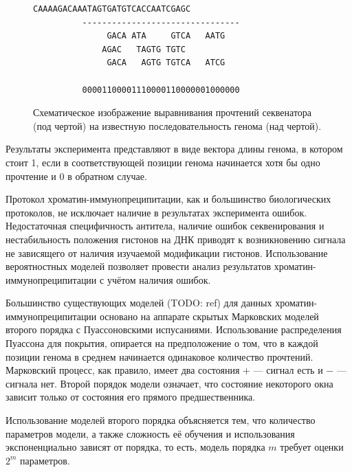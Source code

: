 \documentclass[10pt,a4paper]{article}
\begin{document}
\begin{figure}[h]
  \centering
\begin{Verbatim}[commandchars=\\\{\}]
          CAAAAGACAAATAGTGATGTCACCAATCGAGC
          --------------------------------
               GACA ATA     GTCA   AATG
              AGAC   TAGTG TGTC
               GACA   AGTG TGTCA   ATCG

          00001100001110000110000001000000
\end{Verbatim}
  \caption{Схематическое изображение выравнивания прочтений секвенатора (под чертой)
    на известную последовательность генома (над чертой).}
  \label{fig:chip-seq}
\end{figure}

Результаты эксперимента представляют в виде вектора длины генома, в котором
стоит 1, если в соответствующей позиции генома начинается хотя бы одно прочтение
и 0 в обратном случае.


Протокол хроматин-иммунопреципитации, как и большинство биологических
протоколов, не исключает наличие в результатах эксперимента
ошибок. Недостаточная специфичность антитела, наличие ошибок секвенирования
и нестабильность положения гистонов на ДНК приводят к возникновению сигнала не
зависящего от наличия изучаемой модификации гистонов. Использование
вероятностных моделей позволяет провести анализ результатов
хроматин-иммунопреципитации с учётом наличия ошибок.

Большинство существующих моделей (TODO: ref) для данных
хроматин-иммунопреципитации основано на аппарате скрытых Марковских моделей
второго порядка с Пуассоновскими испусаниями. Использование распределения
Пуассона для покрытия, опирается на предположение о том, что в каждой
позиции генома в среднем начинается одинаковое количество прочтений. Марковский
процесс, как правило, имеет два состояния $+$ --- сигнал есть и $-$ --- сигнала
нет. Второй порядок модели означает, что состояние некоторого окна зависит только
от состояния его прямого предшественника.

Использование моделей второго порядка объясняется тем, что количество параметров
модели, а также сложность её обучения и использования экспоненциально зависят от
порядка, то есть, модель порядка $m$ требует оценки $2^m$ параметров.

\end{document}
